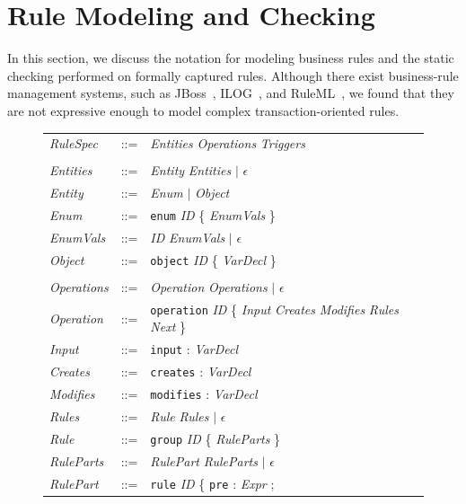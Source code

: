 
\newcommand{\term}{\textit}
\newcommand{\lit}{\texttt}

\section{Rule Modeling and Checking}
\label{sec:model}

In this section, we discuss the notation for modeling business rules and the
static checking performed on formally captured rules. Although there exist
business-rule management systems, such as JBoss~\cite{JBoss}, ILOG~\cite{ILog},
and RuleML~\cite{RuleML}, we found that they are not expressive enough to model
complex transaction-oriented rules.

\begin{figure}[t]
\centering
{\footnotesize
\tabcolsep=3pt
\begin{tabular}{lll}
\term{RuleSpec} & ::= & \term{Entities} \term{Operations} \term{Triggers} \\
\\
\term{Entities} & ::= & \term{Entity} \term{Entities} $|$ $\epsilon$ \\
\term{Entity} & ::= & \term{Enum} $|$ \term{Object} \\
\term{Enum} & ::= & \lit{enum} \term{ID} \{ \term{EnumVals} \} \\
\term{EnumVals} & ::= & \term{ID} \term{EnumVals} $|$ $\epsilon$ \\
\term{Object} & ::= & \lit{object} \term{ID} \{ \term{VarDecl} \} \\
\\
\term{Operations} & ::= & \term{Operation} \term{Operations} $|$ $\epsilon$ \\
\term{Operation} & ::= & \lit{operation} \term{ID} \{ \term{Input}
\term{Creates} \term{Modifies} \term{Rules} \term{Next} \} \\
\term{Input} & ::= & \lit{input} : \term{VarDecl} \\
\term{Creates} & ::= & \lit{creates} : \term{VarDecl} \\
\term{Modifies} & ::= & \lit{modifies} : \term{VarDecl} \\
\term{Rules} & ::= & \term{Rule} \term{Rules} $|$ $\epsilon$ \\
\term{Rule} & ::= & \lit{group} \term{ID} \{ \term{RuleParts} \} \\
\term{RuleParts} & ::= & \term{RulePart} \term{RuleParts} $|$ $\epsilon$ \\
\term{RulePart} & ::= & \lit{rule} \term{ID} \{ \lit{pre} : \term{Expr} ;

\end{tabular}}
\end{figure}
